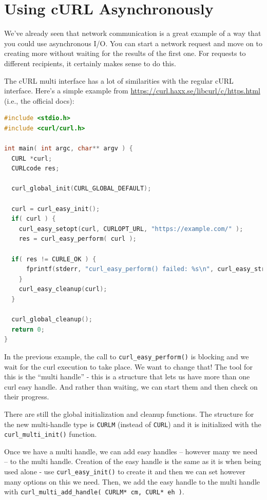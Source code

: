 \documentclass[a4paper]{report}
\begin{document}
\section*{Using cURL Asynchronously}
We've already seen that network communication is a great example of a way that you could use asynchronous  I/O. You can start a network request and move on to creating more without waiting for the results of the first one. For requests to different recipients, it certainly makes sense to do this.

The cURL multi interface has a lot of similarities with the regular cURL interface. Here's a simple example from \url{https://curl.haxx.se/libcurl/c/https.html} (i.e., the official docs):

\begin{lstlisting}[language=C]
#include <stdio.h>
#include <curl/curl.h>
 
int main( int argc, char** argv ) {
  CURL *curl;
  CURLcode res;
 
  curl_global_init(CURL_GLOBAL_DEFAULT);
 
  curl = curl_easy_init();
  if( curl ) {
    curl_easy_setopt(curl, CURLOPT_URL, "https://example.com/" );
    res = curl_easy_perform( curl );
    
  if( res != CURLE_OK ) {
      fprintf(stderr, "curl_easy_perform() failed: %s\n", curl_easy_strerror(res));
    }
    curl_easy_cleanup(curl);
  }
 
  curl_global_cleanup();
  return 0;
}
\end{lstlisting}

In the previous example, the call to \texttt{curl\_easy\_perform()} is blocking and we wait for the curl execution to take place. We want to change that! The tool for this is the ``multi handle'' - this is a structure that lets us have more than one curl easy handle. And rather than waiting, we can start them and then check on their progress. 

There are still the global initialization and cleanup functions. The structure for the new multi-handle type is \texttt{CURLM} (instead of \texttt{CURL}) and it is initialized with the \texttt{curl\_multi\_init()} function. 

Once we have a multi handle, we can add easy handles -- however many we need -- to the multi handle. Creation of the easy handle is the same as it is when being used alone - use \texttt{curl\_easy\_init()} to create it and then we can set however many options on this we need. Then, we add the easy handle to the multi handle with \texttt{curl\_multi\_add\_handle( CURLM* cm, CURL* eh )}.
\end{document}
